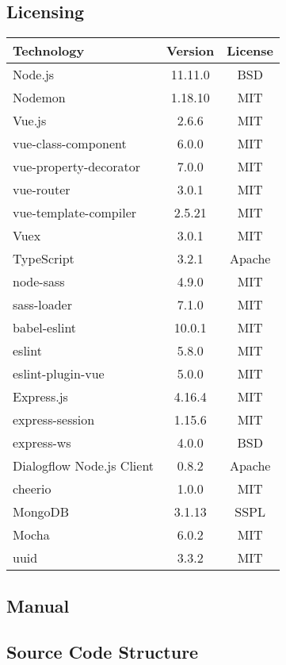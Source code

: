 \subsection{Licensing}
\begin{center}
	\begin{tabular}{ | l | c | c | } 
		\hline
		\textbf{Technology} & \textbf{Version} & \textbf{License} \\ 
		\hline
		Node.js & 11.11.0 & BSD \\
		Nodemon & 1.18.10 & MIT \\
        Vue.js & 2.6.6 & MIT \\
        vue-class-component & 6.0.0 & MIT \\
        vue-property-decorator & 7.0.0 & MIT \\
        vue-router & 3.0.1 & MIT \\
        vue-template-compiler & 2.5.21 & MIT \\
        Vuex & 3.0.1 & MIT \\
        TypeScript & 3.2.1 & Apache \\
        node-sass & 4.9.0 & MIT \\
        sass-loader & 7.1.0 & MIT \\
        babel-eslint & 10.0.1 & MIT \\
        eslint & 5.8.0 & MIT \\
        eslint-plugin-vue & 5.0.0 & MIT \\
		Express.js & 4.16.4 & MIT \\
		express-session & 1.15.6 & MIT \\
		express-ws & 4.0.0 & BSD \\
		Dialogflow Node.js Client & 0.8.2 & Apache \\
        cheerio & 1.0.0 & MIT \\
		MongoDB & 3.1.13 & SSPL \\
		Mocha & 6.0.2 & MIT \\
		uuid & 3.3.2 & MIT \\
		\hline
	\end{tabular}
\end{center}



\subsection{Manual}

\subsection{Source Code Structure}
